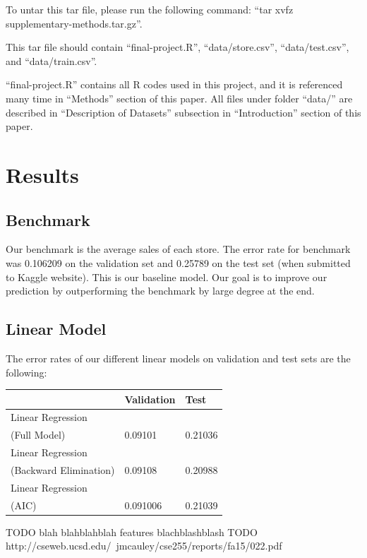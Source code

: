 \documentclass[letterpaper,twocolumn,11pt]{article}
\begin{document}
To untar this tar file, please run the following command: ``tar xvfz supplementary-methods.tar.gz''.

This tar file should contain ``final-project.R'', ``data/store.csv'', ``data/test.csv'', and ``data/train.csv''.

``final-project.R'' contains all R codes used in this project, and it is referenced many time in ``Methods'' section of this paper. All files under folder ``data/'' are described in ``Description of Datasets'' subsection in ``Introduction'' section of this paper.

\section{Results}
\subsection{Benchmark}
Our benchmark is the average sales of each store. The error rate for benchmark was 0.106209 on the validation set and 0.25789 on the test set (when submitted to Kaggle website). This is our baseline model. Our goal is to improve our prediction by outperforming the benchmark by large degree at the end. 

\subsection{Linear Model}
The error rates of our different linear models on validation and test sets are the following:


\begin{center}
    \begin{tabular}{| l | l | l |}
      \hline
       & Validation & Test \\ \hline
      Linear Regression \\
      (Full Model) & 0.09101 & 0.21036 \\ \hline
      Linear Regression \\
      (Backward Elimination) & 0.09108 & 0.20988 \\ \hline
      Linear Regression \\
      (AIC) & 0.091006 & 0.21039 \\ \hline
      \hline    
    \end{tabular}
\end{center}

TODO blah blahblahblah features blachblashblash 
TODO http://cseweb.ucsd.edu/~jmcauley/cse255/reports/fa15/022.pdf
\end{document}
